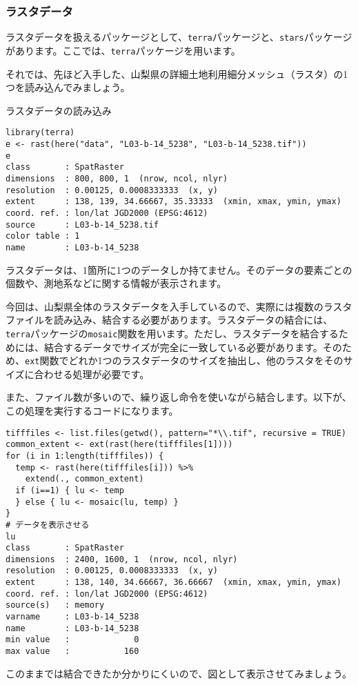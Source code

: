   \subsubsection{ラスタデータ}
ラスタデータを扱えるパッケージとして、\verb|terra|パッケージと、\verb|stars|パッケージがあります。ここでは、\verb|terra|パッケージを用います。

それでは、先ほど入手した、山梨県の詳細土地利用細分メッシュ（ラスタ）の1つを読み込んでみましょう。
\begin{itembox}[l]{ラスタデータの読み込み}
\begin{verbatim}
library(terra)
e <- rast(here("data", "L03-b-14_5238", "L03-b-14_5238.tif"))
e
class       : SpatRaster 
dimensions  : 800, 800, 1  (nrow, ncol, nlyr)
resolution  : 0.00125, 0.0008333333  (x, y)
extent      : 138, 139, 34.66667, 35.33333  (xmin, xmax, ymin, ymax)
coord. ref. : lon/lat JGD2000 (EPSG:4612) 
source      : L03-b-14_5238.tif 
color table : 1 
name        : L03-b-14_5238 
\end{verbatim}
\end{itembox}
ラスタデータは、1箇所に1つのデータしか持てません。そのデータの要素ごとの個数や、測地系などに関する情報が表示されます。

今回は、山梨県全体のラスタデータを入手しているので、実際には複数のラスタファイルを読み込み、結合する必要があります。ラスタデータの結合には、\verb|terra|パッケージの\verb|mosaic|関数を用います。ただし、ラスタデータを結合するためには、結合するデータでサイズが完全に一致している必要があります。そのため、\verb|ext|関数でどれか1つのラスタデータのサイズを抽出し、他のラスタをそのサイズに合わせる処理が必要です。

また、ファイル数が多いので、繰り返し命令を使いながら結合します。以下が、この処理を実行するコードになります。
\begin{verbatim}
tifffiles <- list.files(getwd(), pattern="*\\.tif", recursive = TRUE)
common_extent <- ext(rast(here(tifffiles[1])))
for (i in 1:length(tifffiles)) {
  temp <- rast(here(tifffiles[i])) %>%
    extend(., common_extent)
  if (i==1) { lu <- temp
  } else { lu <- mosaic(lu, temp) }
}
# データを表示させる
lu
class       : SpatRaster 
dimensions  : 2400, 1600, 1  (nrow, ncol, nlyr)
resolution  : 0.00125, 0.0008333333  (x, y)
extent      : 138, 140, 34.66667, 36.66667  (xmin, xmax, ymin, ymax)
coord. ref. : lon/lat JGD2000 (EPSG:4612) 
source(s)   : memory
varname     : L03-b-14_5238 
name        : L03-b-14_5238 
min value   :             0 
max value   :           160 
\end{verbatim}
このままでは結合できたか分かりにくいので、図として表示させてみましょう。

